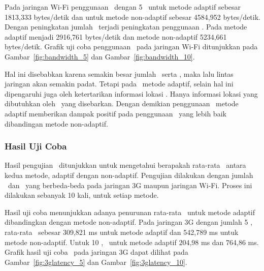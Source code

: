 Pada jaringan Wi-Fi penggunaan \bandwidth~dengan 5 \subscriber~untuk metode
adaptif sebesar 1813,333 bytes/detik dan untuk metode non-adaptif sebesar
4584,952 bytes/detik. Dengan peningkatan jumlah \subscriber~terjadi peningkatan
penggunaan \bandwidth. Pada metode adaptif menjadi 2916,761 bytes/detik dan
metode non-adaptif 5234,661 bytes/detik. Grafik uji coba penggunaan
\bandwidth~pada jaringan Wi-Fi ditunjukkan pada Gambar~\ref{fig:bandwidth_5} dan
Gambar~\ref{fig:bandwidth_10}.

Hal ini disebabkan karena semakin besar jumlah \publisher~serta \subscriber,
maka lalu lintas jaringan akan semakin padat. Tetapi pada \tracking~metode
adaptif, selain hal ini dipengaruhi juga oleh ketertarikan informasi lokasi
\subscriber. Hanya informasi lokasi yang dibutuhkan oleh \subscriber~yang
disebarkan. Dengan demikian penggunaan \tracking~metode adaptif memberikan
dampak positif pada penggunaan \bandwidth~yang lebih baik dibandingan metode
non-adaptif.


\subsubsection{Hasil Uji Coba \Latency}

Hasil pengujian \latency~ditunjukkan untuk mengetahui berapakah rata-rata
\latency~antara kedua metode, adaptif dengan non-adaptif. Pengujian dilakukan
dengan jumlah \publisher~dan \subscriber~yang berbeda-beda pada jaringan 3G
maupun jaringan Wi-Fi. Proses ini dilakukan sebanyak 10 kali, untuk setiap metode.

Hasil uji coba menunjukkan adanya penurunan rata-rata \latency~untuk metode
adaptif dibandingkan dengan metode non-adaptif. Pada jaringan 3G dengan jumlah 5
\subscriber, rata-rata \latency~sebesar 309,821 ms untuk metode adaptif dan
542,789 ms untuk metode non-adaptif. Untuk 10 \subscriber, \latency~untuk metode
adaptif 204,98 ms dan 764,86 ms. Grafik hasil uji coba \latency~pada jaringan 3G
dapat dilihat pada Gambar~\ref{fig:3glatency_5} dan
Gambar~\ref{fig:3glatency_10}.


